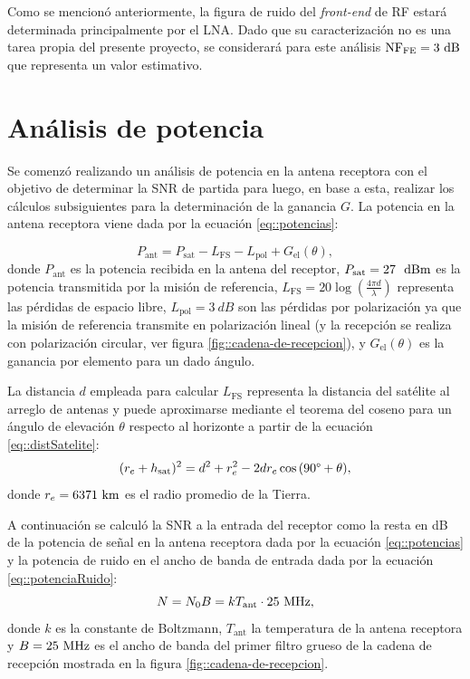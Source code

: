 \documentclass[../../main.tex]{subfiles}
\begin{document}
Como se mencionó anteriormente, la figura de ruido del \textit{front-end} de RF estará determinada principalmente por el LNA. Dado que su caracterización no es una tarea propia del presente proyecto, se considerará para este análisis $\textrm{NF}_\textrm{FE} = 3~\textrm{dB}$ que representa un valor estimativo.

\section{Análisis de potencia} 
Se comenzó realizando un análisis de potencia en la antena receptora con el objetivo de determinar la SNR de partida para luego, en base a esta, realizar los cálculos subsiguientes para la determinación de la ganancia $G$. La potencia en la antena receptora viene dada por la ecuación \ref{eq::potencias}:

\begin{equation}
    P_\textrm{ant} = P_\textrm{sat} - L_\textrm{FS} - L_\textrm{pol} + G_\textrm{el} (\theta),
    \label{eq::potencias}
\end{equation}
donde $P_\textrm{ant}$ es la potencia recibida en la antena del receptor, 
$P_\textrm{sat} = 27~~\textrm{dBm}$ es la potencia transmitida por la misión de referencia, $L_\textrm{FS} = 20 \log \left(\frac{4 \pi d}{\lambda}\right)$ representa las pérdidas de espacio libre, $L_\textrm{pol} = 3~dB$
 son las pérdidas por polarización ya que la misión de referencia transmite en polarización lineal (y la recepción se realiza con polarización circular, ver figura \ref{fig::cadena-de-recepcion}), y $G_\textrm{el} (\theta)$ es la ganancia por elemento para un dado ángulo.

La distancia $d$ empleada para calcular $L_\textrm{FS}$ representa la distancia del satélite al arreglo de antenas y puede aproximarse mediante el teorema del coseno para un ángulo de elevación $\theta$ respecto al horizonte a partir de la ecuación \ref{eq::distSatelite}:
\begin{equation}
    (r_e + h_\textrm{sat})^2 = d^2 + r_e^2 - 2 d r_e \cos{(90\degree + \theta)},
    \label{eq::distSatelite}
\end{equation}
donde $r_e = 6371~\textrm{km}$ es el radio promedio de la Tierra.

A continuación se calculó la SNR a la entrada del receptor como la resta en dB de la potencia de señal en la antena receptora dada por la ecuación \ref{eq::potencias} y la potencia de ruido en el ancho de banda de entrada dada por la ecuación \ref{eq::potenciaRuido}:
\begin{equation}
    N = N_0 B = k T_\textrm{ant} \cdot 25~\textrm{MHz},
    \label{eq::potenciaRuido}
\end{equation} 
donde $k$ es la constante de Boltzmann, $T_\textrm{ant}$ la temperatura de la antena receptora y $B = 25~\textrm{MHz}$ es el ancho de banda del primer filtro grueso de la cadena de recepción mostrada en la figura \ref{fig::cadena-de-recepcion}.
\end{document}
